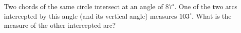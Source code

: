 Two chords of the same circle intersect at an angle of $87^\circ$. One of the two arcs intercepted by this angle (and its vertical angle) measures $103^\circ$. What is the measure of the other intercepted arc?
